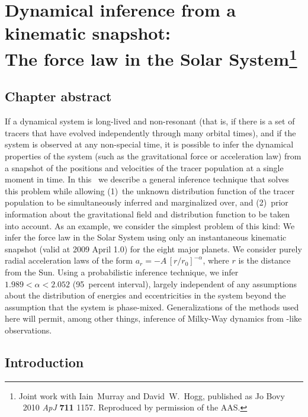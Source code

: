
\chapter[Dynamical inference from a kinematic snapshot: The force law in the Solar System]{Dynamical inference from a kinematic snapshot:\\
  The force law in the Solar System\protect\footnote{Joint work with
  Iain~Murray and David~W.~Hogg, published as Jo Bovy \etal\
  2010 \emph{ApJ} {\bf 711} 1157. Reproduced by permission of the
  AAS.}\label{chap:solarsystem}}

\section{Chapter abstract}
If a dynamical system is long-lived and non-resonant (that is, if
there is a set of tracers that have evolved independently through many
orbital times), and if the system is observed at any non-special time,
it is possible to infer the dynamical properties of the system (such
as the gravitational force or acceleration law) from a snapshot of the
positions and velocities of the tracer population at a single moment
in time. In this \chaptername\ we describe a general inference
technique that solves this problem while allowing (1)~the unknown
distribution function of the tracer population to be simultaneously
inferred and marginalized over, and (2)~prior information about the
gravitational field and distribution function to be taken into
account. As an example, we consider the simplest problem of this kind:
We infer the force law in the Solar System using only an instantaneous
kinematic snapshot (valid at 2009 April 1.0) for the eight major
planets. We consider purely radial acceleration laws of the form $a_r=
-A\,[r/r_0]^{-\alpha}$, where $r$ is the distance from the Sun.  Using
a probabilistic inference technique, we infer $1.989<\alpha<2.052$
(95~percent interval), largely independent of any assumptions about
the distribution of energies and eccentricities in the system beyond
the assumption that the system is phase-mixed. Generalizations of the
methods used here will permit, among other things, inference of
Milky-Way dynamics from \Gaia-like observations.

\section{Introduction}

